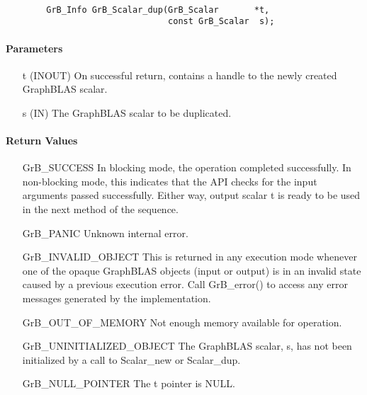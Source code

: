 \paragraph{\syntax}

\begin{verbatim}
        GrB_Info GrB_Scalar_dup(GrB_Scalar       *t,
                                const GrB_Scalar  s);
\end{verbatim}

\paragraph{Parameters}

\begin{itemize}[leftmargin=1.1in]
    \item[{\sf t}]  ({\sf INOUT}) On successful return, contains a handle
                                  to the newly created GraphBLAS scalar.
    \item[{\sf s}]  ({\sf IN})    The GraphBLAS scalar to be duplicated.
\end{itemize}

\paragraph{Return Values}

\begin{itemize}[leftmargin=2.1in]
    \item[{\sf GrB\_SUCCESS}]         In blocking mode, the operation completed
    successfully. In non-blocking mode, this indicates that the API checks 
    for the input arguments passed successfully. Either way, output scalar 
    {\sf t} is ready to be used in the next method of the sequence.

    \item[{\sf GrB\_PANIC}]           Unknown internal error.
    
    \item[{\sf GrB\_INVALID\_OBJECT}] This is returned in any execution mode 
    whenever one of the opaque GraphBLAS objects (input or output) is in an invalid 
    state caused by a previous execution error.  Call {\sf GrB\_error()} to access 
    any error messages generated by the implementation.

    \item[{\sf GrB\_OUT\_OF\_MEMORY}] Not enough memory available for operation.
    
    \item[{\sf GrB\_UNINITIALIZED\_OBJECT}]  The GraphBLAS scalar, {\sf s}, has 
    not been initialized by a call to {\sf Scalar\_new} or {\sf Scalar\_dup}.
    
    \item[{\sf GrB\_NULL\_POINTER}]  The {\sf t} pointer is {\sf NULL}.
\end{itemize}

